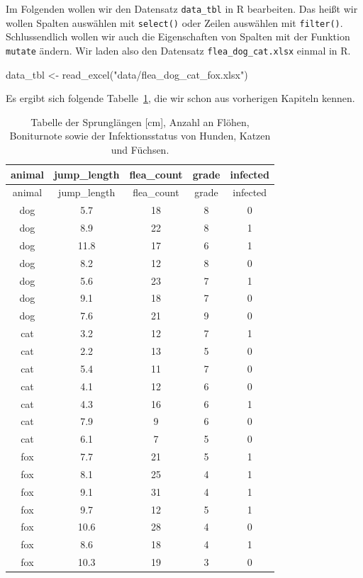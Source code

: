 \documentclass[
  letterpaper,
]{scrbook}
\newenvironment{Shaded}{\begin{snugshade}}{\end{snugshade}}
\newcommand{\FunctionTok}[1]{\textcolor[rgb]{0.28,0.35,0.67}{#1}}
\newcommand{\NormalTok}[1]{\textcolor[rgb]{0.00,0.23,0.31}{#1}}
\newcommand{\OtherTok}[1]{\textcolor[rgb]{0.00,0.23,0.31}{#1}}
\newcommand{\StringTok}[1]{\textcolor[rgb]{0.13,0.47,0.30}{#1}}
\begin{document}
Im Folgenden wollen wir den Datensatz \texttt{data\_tbl} in R
bearbeiten. Das heißt wir wollen Spalten auswählen mit \texttt{select()}
oder Zeilen auswählen mit \texttt{filter()}. Schlussendlich wollen wir
auch die Eigenschaften von Spalten mit der Funktion \texttt{mutate}
ändern. Wir laden also den Datensatz \texttt{flea\_dog\_cat.xlsx} einmal
in R.

\begin{Shaded}
\begin{Highlighting}[]
\NormalTok{data\_tbl }\OtherTok{\textless{}{-}} \FunctionTok{read\_excel}\NormalTok{(}\StringTok{"data/flea\_dog\_cat\_fox.xlsx"}\NormalTok{)}
\end{Highlighting}
\end{Shaded}

Es ergibt sich folgende Tabelle~\ref{tbl-dog-cat-dplyr}, die wir schon
aus vorherigen Kapiteln kennen.

\hypertarget{tbl-dog-cat-dplyr}{}
\begin{longtable}[]{@{}ccccc@{}}
\caption{\label{tbl-dog-cat-dplyr}Tabelle der Sprunglängen {[}cm{]},
Anzahl an Flöhen, Boniturnote sowie der Infektionsstatus von Hunden,
Katzen und Füchsen.}\tabularnewline
\toprule()
animal & jump\_length & flea\_count & grade & infected \\
\midrule()
\endfirsthead
\toprule()
animal & jump\_length & flea\_count & grade & infected \\
\midrule()
\endhead
dog & 5.7 & 18 & 8 & 0 \\
dog & 8.9 & 22 & 8 & 1 \\
dog & 11.8 & 17 & 6 & 1 \\
dog & 8.2 & 12 & 8 & 0 \\
dog & 5.6 & 23 & 7 & 1 \\
dog & 9.1 & 18 & 7 & 0 \\
dog & 7.6 & 21 & 9 & 0 \\
cat & 3.2 & 12 & 7 & 1 \\
cat & 2.2 & 13 & 5 & 0 \\
cat & 5.4 & 11 & 7 & 0 \\
cat & 4.1 & 12 & 6 & 0 \\
cat & 4.3 & 16 & 6 & 1 \\
cat & 7.9 & 9 & 6 & 0 \\
cat & 6.1 & 7 & 5 & 0 \\
fox & 7.7 & 21 & 5 & 1 \\
fox & 8.1 & 25 & 4 & 1 \\
fox & 9.1 & 31 & 4 & 1 \\
fox & 9.7 & 12 & 5 & 1 \\
fox & 10.6 & 28 & 4 & 0 \\
fox & 8.6 & 18 & 4 & 1 \\
fox & 10.3 & 19 & 3 & 0 \\
\bottomrule()
\end{longtable}
\end{document}
